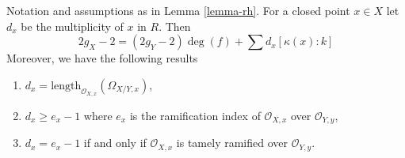 \begin{lemma}
\label{lemma-rhe}
Notation and assumptions as in Lemma \ref{lemma-rh}. For a closed point
$x \in X$ let $d_x$ be the multiplicity of $x$ in $R$. Then
$$
2g_X - 2 = (2g_Y - 2) \deg(f) + \sum\nolimits d_x [\kappa(x) : k]
$$
Moreover, we have the following results
\begin{enumerate}
\item $d_x = \text{length}_{\mathcal{O}_{X, x}}(\Omega_{X/Y, x})$,
\item $d_x \geq e_x - 1$ where $e_x$ is the ramification index
of $\mathcal{O}_{X, x}$ over $\mathcal{O}_{Y, y}$,
\item $d_x = e_x - 1$ if and only if $\mathcal{O}_{X, x}$ is tamely
ramified over $\mathcal{O}_{Y, y}$.
\end{enumerate}
\end{lemma}

